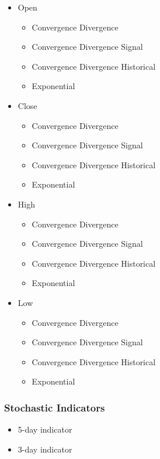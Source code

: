 \documentclass[journal]{IEEEtran}
\begin{document}
\begin{itemize}
	\item Open
	\begin{itemize}
		\item Convergence Divergence
		\item Convergence Divergence Signal
		\item Convergence Divergence Historical
		\item Exponential
	\end{itemize}
	\item Close
	\begin{itemize}
		\item Convergence Divergence
		\item Convergence Divergence Signal
		\item Convergence Divergence Historical
		\item Exponential
	\end{itemize}
	\item High
	\begin{itemize}
		\item Convergence Divergence
		\item Convergence Divergence Signal
		\item Convergence Divergence Historical
		\item Exponential
	\end{itemize}
	\item Low
	\begin{itemize}
		\item Convergence Divergence
		\item Convergence Divergence Signal
		\item Convergence Divergence Historical
		\item Exponential
	\end{itemize}
\end{itemize}

\subsubsection{Stochastic Indicators}

\begin{itemize}
	\item 5-day indicator
	\item 3-day indicator
\end{itemize}
\end{document}
